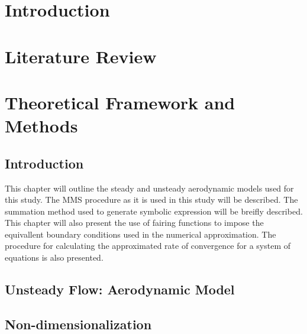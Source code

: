 \documentclass[12pt]{uthesis-v12}  %
\begin{document}
\chapter{Introduction}


\chapter{Literature Review}



% 

\chapter{Theoretical Framework and Methods}

\section{Introduction}
This chapter will outline the steady and unsteady aerodynamic
models used for this study. The MMS procedure as it is used in this study will 
be described. The summation method used to generate symbolic expression will 
be breifly described. This chapter will also present the use of fairing functions 
to impose the equivallent boundary conditions used in the numerical approximation.
The procedure for calculating the approximated rate of convergence for a system
of equations is also presented.





\section{Unsteady Flow: Aerodynamic Model}
\section{Non-dimensionalization}


% 

% 
\end{document}
